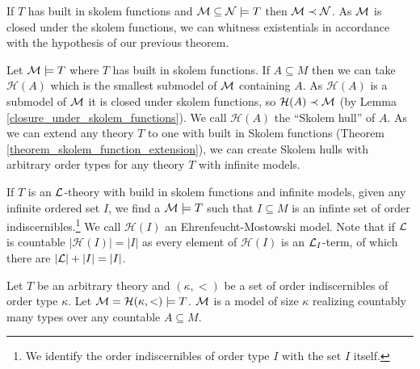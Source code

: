 \begin{lemma}\label{closure_under_skolem_functions}
If \(T\) has built in skolem functions and \(\mathcal{M} \subseteq \mathcal{N} \models T\) then \(\mathcal{M} \prec \mathcal{N}\). 
As \(\mathcal{M}\) is closed under the skolem functions, we can whitness existentials in accordance with the hypothesis of our previous theorem. 
\end{lemma}

\begin{definition}\label{definition_skolem_hull}
Let \(\mathcal{M} \models T\) where \(T\) has built in skolem functions. 
If \(A \subseteq M\) then we can take \(\mathcal{H}(A)\) which is the smallest submodel of \(\mathcal{M}\) containing \(A\).
As \(\mathcal{H}(A)\) is a submodel of \(\mathcal{M}\) it is closed under skolem functions, so \(\mathcal{H}(A) \prec \mathcal{M}\) (by Lemma \ref{closure_under_skolem_functions}).
We call \(\mathcal{H}(A)\) the ``Skolem hull'' of \(A\). As we can extend any theory \(T\) to one with built in Skolem functions (Theorem \ref{theorem_skolem_function_extension}), we can create Skolem hulls with arbitrary order types for any theory \(T\) with infinite models.
\end{definition}

\begin{definition}\label{definition_ehrenfeuct_mostowski_model}
If \(T\) is an \(\mathcal{L}\)-theory with build in skolem functions and infinite models, given any infinite ordered set \(I\), we find a \(\mathcal{M} \models T\) such that \(I \subseteq M\) is an infinte set of order indiscernibles.\footnote{We identify the order indiscernibles of order type \(I\) with the set \(I\) itself.}
We call \(\mathcal{H}(I)\) an Ehrenfeucht-Mostowski model. 
Note that if \(\mathcal{L}\) is countable \(|\mathcal{H}(I)| = |I|\) as every element of \(\mathcal{H}(I)\) is an \(\mathcal{L}_{I}\)-term, of which there are \(|\mathcal{L}|+|I| = |I|\).
\end{definition}

\begin{theorem}\label{theorem_ehrenfeuct_mostowski_types}
Let \(T\) be an arbitrary theory and \((\kappa, <)\) be a set of order indiscernibles of order type \(\kappa\).
Let \(\mathcal{M} = \mathcal{H}(\kappa, <)\models T\). 
\(\mathcal{M}\) is a model of size \(\kappa\) realizing countably many types over any countable \(A \subseteq M\).
\end{theorem}

